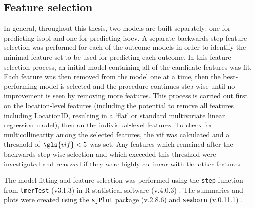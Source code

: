  \subsection{Feature selection}
 \label{sec:featureSelection}
In general, throughout this thesis, two models are built separately: one for predicting \gls{isopl} and one for predicting \gls{isoev}. A separate backwards-step feature selection was performed for each of the outcome models in order to identify the minimal feature set to be used for predicting each outcome. In this feature selection process, an initial model containing all of the candidate features was fit. Each feature was then removed from the model one at a time, then the best-performing model is selected and the procedure continues step-wise until no improvement is seen by removing more features. This process is carried out first on the location-level features (including the potential to remove all features including LocationID, resulting in a `flat' or standard multivariate linear regression model), then on the individual-level features.  To check for multicollinearity among the selected features, the \gls{vif} was calculated and a threshold of $\gls{vif} < 5$ was set. Any features which remained after the backwards step-wise selection and which exceeded this threshold were investigated and removed if they were highly collinear with the other features.

   The model fitting and feature selection was performed using the \texttt{step} function from \texttt{lmerTest} (v3.1.3) \citep{Kuznetsova2017lmerTest} in R statistical software (v.4.0.3) \citep{RCT2018R}. The summaries and plots were created using the \texttt{sjPlot} package (v.2.8.6) \citep{Luedecke2021sjPlot} and \texttt{seaborn} (v.0.11.1) \citep{Waskom2021seaborn}.


